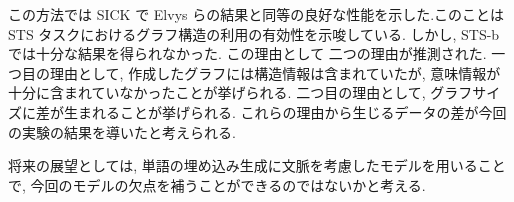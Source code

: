 \documentclass{abst}
\begin{document}
{この方法では SICK で Elvys らの結果と同等の良好な性能を示した.このことは STS タスクにおけるグラフ構造の利用の有効性を示唆している.
しかし, STS-b では十分な結果を得られなかった.
この理由として 二つの理由が推測された.
一つ目の理由として, 作成したグラフには構造情報は含まれていたが, 意味情報が十分に含まれていなかったことが挙げられる.
二つ目の理由として, グラフサイズに差が生まれることが挙げられる.
これらの理由から生じるデータの差が今回の実験の結果を導いたと考えられる.
\par 将来の展望としては, 単語の埋め込み生成に文脈を考慮したモデルを用いることで, 今回のモデルの欠点を補うことができるのではないかと考える.
}
\end{document}
